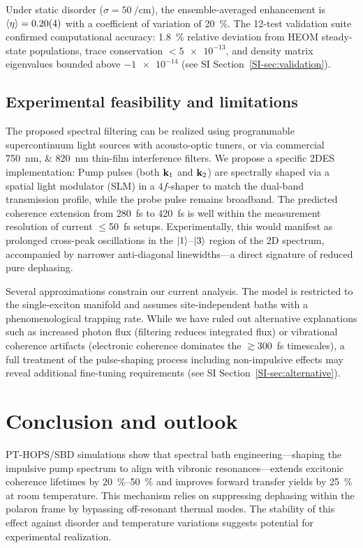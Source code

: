 \documentclass[journal=jpcl,manuscript=letter]{achemso}
\begin{document}
Under static disorder ($\sigma = \SI{50}{\per\centi\meter}$), the ensemble-averaged enhancement is $\expval{\eta} = 0.20(4)$ with a coefficient of variation of \SI{20}{\percent}. The 12-test validation suite confirmed computational accuracy: \SI{1.8}{\percent} relative deviation from HEOM steady-state populations, trace conservation $< \num{5e-13}$, and density matrix eigenvalues bounded above $\num{-1e-14}$ (see SI Section~\ref{SI-sec:validation}).

\subsection{Experimental feasibility and limitations}

The proposed spectral filtering can be realized using programmable supercontinuum light sources with acousto-optic tuners,\cite{Gunthardt2023} or via commercial \SIlist{750;820}{\nano\meter} thin-film interference filters. We propose a specific 2DES implementation:\cite{Sebastian2024} Pump pulses (both $\vb{k}_1$ and $\vb{k}_2$) are spectrally shaped via a spatial light modulator (SLM) in a $4f$-shaper to match the dual-band transmission profile, while the probe pulse remains broadband.
The predicted coherence extension from \SI{280}{\femto\second} to \SI{420}{\femto\second} is well within the measurement resolution of current $\leq$\SI{50}{\femto\second} setups.\cite{Engel2007} Experimentally, this would manifest as prolonged cross-peak oscillations in the $\ket{1}$--$\ket{3}$ region of the 2D spectrum, accompanied by narrower anti-diagonal linewidths—a direct signature of reduced pure dephasing. 

Several approximations constrain our current analysis. The model is restricted to the single-exciton manifold and assumes site-independent baths with a phenomenological trapping rate. While we have ruled out alternative explanations such as increased photon flux (filtering reduces integrated flux) or vibrational coherence artifacts (electronic coherence dominates the $\gtrsim$\SI{300}{\femto\second} timescales), a full treatment of the pulse-shaping process including non-impulsive effects may reveal additional fine-tuning requirements (see SI Section~\ref{SI-sec:alternative}).

\section{Conclusion and outlook}
PT-HOPS/SBD simulations show that spectral bath engineering---shaping the impulsive pump spectrum to align with vibronic resonances---extends excitonic coherence lifetimes by \SIrange{20}{50}{\percent} and improves forward transfer yields by \SI{25}{\percent} at room temperature. This mechanism relies on suppressing dephasing within the polaron frame by bypassing off-resonant thermal modes. The stability of this effect against disorder and temperature variations suggests potential for experimental realization.
\end{document}
